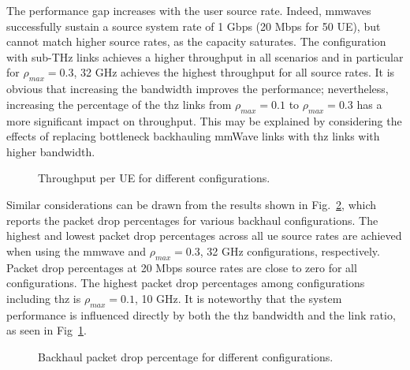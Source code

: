 The performance gap increases with the user source rate. Indeed, 
\glspl{mmwave} successfully sustain a source system rate of 1 Gbps (20 Mbps for 50 UE), 
but cannot match higher source rates, as the capacity saturates.
The configuration with sub-THz links achieves a higher throughput in all scenarios and in particular for $\rho_{max} = 0.3$, 32 GHz achieves the highest throughput for all source rates. It is obvious that increasing the bandwidth improves the performance; nevertheless, increasing the percentage of the \gls{thz} links from $\rho_{max} = 0.1$ to $\rho_{max} = 0.3$ has a more significant impact on throughput. 
This may be explained by considering the effects of replacing bottleneck backhauling mmWave links with \gls{thz} links with higher bandwidth.


\begin{figure}
    \centering
    \setlength{}
    \setlength{}
    
    \caption{Throughput per UE for different configurations.}
    \label{fig:Throughput}
\end{figure}


Similar considerations can be drawn from the results shown in Fig.~\ref{fig:packetDrop}, which reports the packet drop percentages for various backhaul configurations. %
The highest and lowest packet drop percentages across all \gls{ue} source rates are achieved when using the \gls{mmwave} and $\rho_{max} = 0.3$, 32 GHz configurations, respectively. Packet drop percentages at 20 Mbps source rates are close to zero for all configurations. The highest packet drop percentages among configurations including \gls{thz} is $\rho_{max} = 0.1$, 10 GHz. It is noteworthy that the system performance is influenced directly by both the \gls{thz} bandwidth and the link ratio, as seen in Fig~\ref{fig:Throughput}.

\begin{figure}
    \centering
    \setlength{}
    \setlength{}
    
    \caption{Backhaul packet drop percentage for different configurations.}
    \label{fig:packetDrop}
\end{figure}

